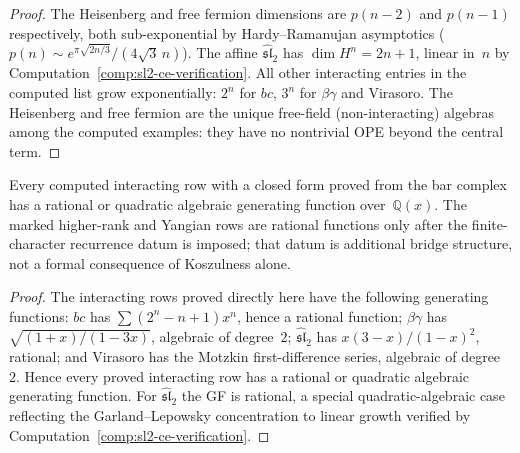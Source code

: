 \begin{proof}
The Heisenberg and free fermion dimensions are $p(n-2)$ and $p(n-1)$ respectively, both sub-exponential by Hardy--Ramanujan asymptotics ($p(n) \sim e^{\pi\sqrt{2n/3}}/(4\sqrt{3}\,n)$). The affine $\widehat{\mathfrak{sl}}_2$ has $\dim H^n = 2n+1$, linear in~$n$ by Computation~\ref{comp:sl2-ce-verification}. All other interacting entries in the computed list grow exponentially: $2^n$ for $bc$, $3^n$ for $\beta\gamma$ and Virasoro. The Heisenberg and free fermion are the unique free-field (non-interacting) algebras among the computed examples: they have no nontrivial OPE beyond the central term.
\end{proof}

\begin{corollary}
\label{cor:algebraicity-koszul}
Every computed interacting row with a closed form proved from the bar
complex has a rational or quadratic algebraic generating function
over~$\mathbb{Q}(x)$.  The marked
higher-rank and Yangian rows are rational functions only after the
finite-character recurrence datum is imposed; that datum is additional
bridge structure, not a formal consequence of Koszulness alone.
\end{corollary}

\begin{proof}
The interacting rows proved directly here have the following
generating functions:
$bc$ has $\sum (2^n-n+1)x^n$, hence a rational function;
$\beta\gamma$ has $\sqrt{(1+x)/(1-3x)}$, algebraic of degree~$2$;
$\widehat{\mathfrak{sl}}_2$ has $x(3-x)/(1-x)^2$, rational;
and Virasoro has the Motzkin first-difference series, algebraic of
degree~$2$. Hence every proved interacting row has a rational or
quadratic algebraic generating function.
For $\widehat{\mathfrak{sl}}_2$ the GF is rational, a special
quadratic-algebraic case reflecting the Garland--Lepowsky concentration to
linear growth verified by Computation~\ref{comp:sl2-ce-verification}.
\end{proof}

